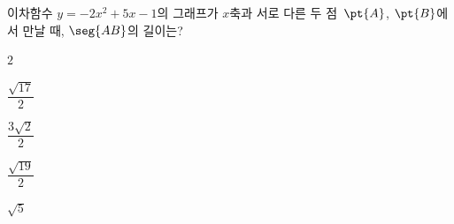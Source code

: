이차함수 $y=-2x^2+5x-1$의 그래프가 $x$축과 서로 다른 두 점~$\pt{A}$, $\pt{B}$에서 만날 때, $\seg{AB}$의 길이는?
\begin{choices32}{\rule[-3ex]{0pt}{8ex}$2$}{\rule[-3ex]{0pt}{8ex}$\dfrac{\sqrt{17}}{2}$}{\rule[-3ex]{0pt}{8ex}$\dfrac{3\sqrt{2}}{2}$}{\rule[-3ex]{0pt}{8ex}$\dfrac{\sqrt{19}}{2}$}{\rule[-3ex]{0pt}{8ex}$\sqrt{5}$}\end{choices32}
